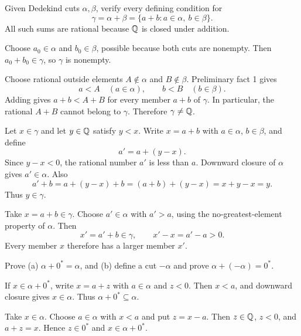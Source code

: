 

\goal Given Dedekind cuts $\alpha,\beta$, verify every defining condition for
\[
 \gamma=\alpha+\beta=\{a+b:a\in\alpha,\ b\in\beta\}.
\]
All such sums are rational because $\mathbb{Q}$ is closed under addition.

Choose $a_0\in\alpha$ and $b_0\in\beta$, possible because both cuts
are nonempty. Then $a_0+b_0\in\gamma$, so $\gamma$ is nonempty.

Choose rational outside elements $A\notin\alpha$ and $B\notin\beta$.
Preliminary fact 1 gives
\[
 a<A\quad(a\in\alpha),\qquad b<B\quad(b\in\beta).
\]
Adding gives $a+b<A+B$ for every member $a+b$ of $\gamma$.
In particular, the rational $A+B$ cannot belong to $\gamma$.
Therefore $\gamma\ne\mathbb{Q}$.

Let $x\in\gamma$ and let $y\in\mathbb{Q}$ satisfy $y<x$.
Write $x=a+b$ with $a\in\alpha$, $b\in\beta$, and define
\[
 a'=a+(y-x).
\]
Since $y-x<0$, the rational number $a'$ is less than $a$.
Downward closure of $\alpha$ gives $a'\in\alpha$. Also
\[
 a'+b=a+(y-x)+b=(a+b)+(y-x)=x+y-x=y.
\]
Thus $y\in\gamma$.

Take $x=a+b\in\gamma$. Choose $a'\in\alpha$ with $a'>a$,
using the no-greatest-element property of $\alpha$. Then
\[
 x'=a'+b\in\gamma,\qquad x'-x=a'-a>0.
\]
Every member $x$ therefore has a larger member $x'$.



\goal Prove (a) $\alpha+0^*=\alpha$, and (b) define a cut $-\alpha$
and prove $\alpha+(-\alpha)=0^*$.

If $x\in\alpha+0^*$, write $x=a+z$ with $a\in\alpha$ and $z<0$.
Then $x<a$, and downward closure gives $x\in\alpha$.
Thus $\alpha+0^*\subseteq\alpha$.

Take $x\in\alpha$. Choose $a\in\alpha$ with $x<a$ and put $z=x-a$.
Then $z\in\mathbb{Q}$, $z<0$, and $a+z=x$. Hence $z\in0^*$ and
$x\in\alpha+0^*$.

